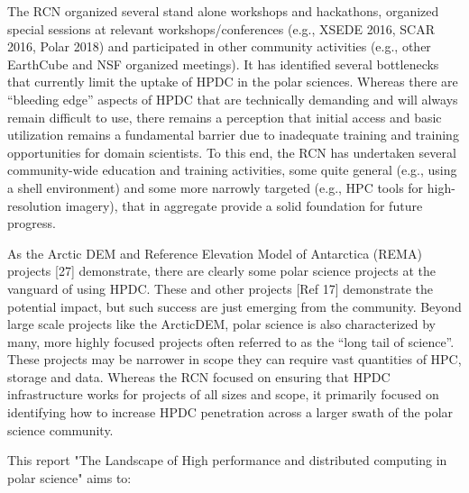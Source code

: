 \documentclass[10pt,letterpaper,draft]{article}
\begin{document}
The RCN organized several stand alone workshops and hackathons, organized special sessions at relevant workshops/conferences (e.g., XSEDE 2016, SCAR 2016, Polar 2018) and participated in other community activities (e.g., other EarthCube and NSF organized meetings). It has identified several bottlenecks that currently limit the uptake of HPDC in the polar sciences. Whereas there are “bleeding edge” aspects of HPDC that are technically demanding and will always remain difficult to use, there remains a perception that initial access and basic utilization remains a fundamental barrier due to inadequate training and training opportunities for domain scientists. To this end, the RCN has undertaken several community-wide education and training activities, some quite general (e.g., using a shell environment) and some more narrowly targeted (e.g., HPC tools for high-resolution imagery), that in aggregate provide a solid foundation for future progress.

As the Arctic DEM and Reference Elevation Model of Antarctica (REMA) projects [27] demonstrate, there are clearly some polar science projects at the vanguard of using HPDC. These and other projects [Ref 17] demonstrate the potential impact, but such success are just emerging from the community. Beyond large scale projects like the ArcticDEM, polar science is also characterized by many, more highly focused projects often referred to as the “long tail of science”. These projects may be narrower in scope they can require vast quantities of HPC, storage and data. Whereas the RCN focused on ensuring that HPDC infrastructure works for projects of all sizes and scope, it primarily focused on identifying how to increase HPDC penetration across a larger swath of the polar science community. 

This report "The Landscape of High performance and distributed computing in polar science" aims to:
\end{document}
